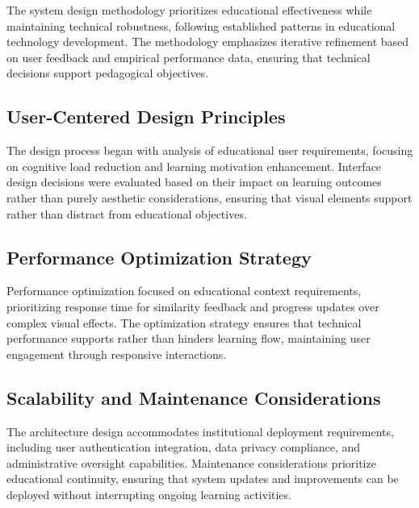 {\color{maroon}
The system design methodology prioritizes educational effectiveness while maintaining technical robustness, following established patterns in educational technology development. The methodology emphasizes iterative refinement based on user feedback and empirical performance data, ensuring that technical decisions support pedagogical objectives.

\subsection{User-Centered Design Principles}

The design process began with analysis of educational user requirements, focusing on cognitive load reduction and learning motivation enhancement. Interface design decisions were evaluated based on their impact on learning outcomes rather than purely aesthetic considerations, ensuring that visual elements support rather than distract from educational objectives.

\subsection{Performance Optimization Strategy}

Performance optimization focused on educational context requirements, prioritizing response time for similarity feedback and progress updates over complex visual effects. The optimization strategy ensures that technical performance supports rather than hinders learning flow, maintaining user engagement through responsive interactions.

\subsection{Scalability and Maintenance Considerations}

The architecture design accommodates institutional deployment requirements, including user authentication integration, data privacy compliance, and administrative oversight capabilities. Maintenance considerations prioritize educational continuity, ensuring that system updates and improvements can be deployed without interrupting ongoing learning activities.
}


